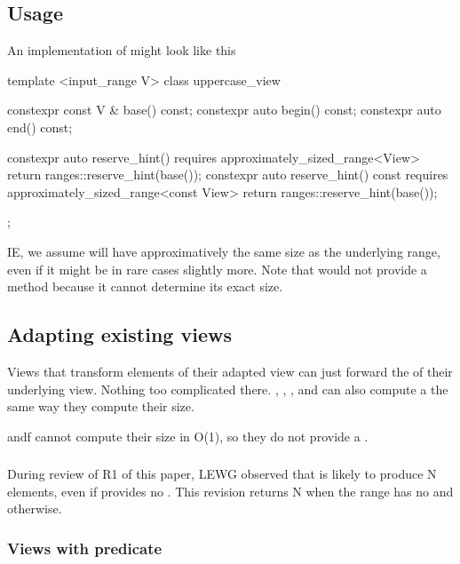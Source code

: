 \documentclass{wg21}
\begin{document}
\subsection{Usage}

An implementation of  might look like this

\begin{colorblock}
template <input_range V>
class uppercase_view {
    constexpr const V & base() const;
    constexpr auto begin() const;
    constexpr auto end() const;

    constexpr auto reserve_hint() requires approximately_sized_range<View> {
        return ranges::reserve_hint(base());
    }
    constexpr auto reserve_hint() const requires approximately_sized_range<const View> {
        return ranges::reserve_hint(base());
    }
};
\end{colorblock}

IE, we assume  will have approximatively the same size as the underlying range, even if it might be in rare cases slightly more.
Note that  would not provide a  method because it cannot determine its exact size.

\subsection{Adapting existing views}

Views that transform elements of their adapted view can just forward the  of their underlying view.
Nothing too complicated there. , ,  ,  and  can also
compute a  the same way they compute their size.

 andf  cannot compute their size in O(1), so they do not provide a .

\subsubsection{}

During review of R1 of this paper, LEWG observed that  is likely to produce N elements,
even if  provides no .
This revision returns N when the range has no  and  otherwise.

\subsubsection{Views with predicate}
\end{document}
